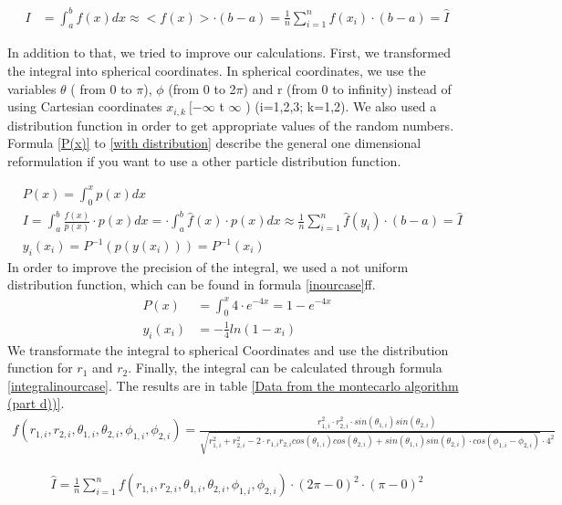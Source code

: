 \documentclass[10pt,a4paper]{article}
\begin{document}
\begin{align}
I &= \int_{a}^{b} f(x) dx \approx < f(x) > \cdot (b-a) = \frac{1}{n} \sum_{i=1}^{n} f(x_i) \cdot (b-a) = \hat{I} \label{integralbrute}
\end{align}
 
In addition to that, we tried to improve our calculations. First, we transformed the integral into spherical coordinates. In spherical coordinates, we use the variables $\theta$ ( from 0 to $\pi$), $\phi$ (from 0 to 2$\pi$) and r (from 0 to infinity) instead of using Cartesian coordinates $x_{i,k} \ [-\infty$ t $\infty$ ) (i=1,2,3; k=1,2). We also used a distribution function in order to get appropriate values of the random numbers.  Formula \ref{P(x)} to \ref{with distribution} describe the general one dimensional reformulation if you want to use a other particle distribution function. 


\begin{align}
&P(x) = \int_{0}^{x} p(x) dx \label{P(x)}\\
& I =  \int_{a}^{b} \frac{f(x)}{p(x)} \cdot p(x) dx = \cdot \int_{a}^{b} \hat{f}(x) \cdot p(x) dx \approx  \frac{1}{n} \sum_{i=1}^{n} \hat{f}(y_i) \cdot (b-a) = \hat{I} \\
&y_i(x_i) =P^{-1}\left(p(y(x_i))\right)= P^{-1}(x_i)\label{with distribution}
\end{align}
In order to improve the precision of the integral, we used a not uniform distribution function, which can be found in formula \ref{inourcase}ff. 
\begin{align}
P(x)&= \int_{0}^{x} 4 \cdot e^{-4 x} = 1- e^{-4x} \label{inourcase}\\
y_i(x_i)&= -\frac{1}{4} ln(1-x_i)
\end{align}
We transformate the integral to spherical Coordinates and use the distribution function for $r_1$ and $r_2$. Finally, the integral can be calculated through formula \ref{integralinourcase}. The results are in table \ref{Data from the  montecarlo algorithm (part d))}.
\begin{align}
f( r_{1,i}, r_{2,i}, \theta_{1,i}, \theta_{2,i}, \phi_{1,i}, \phi_{2,i}) = \frac{r_{1,i}^2 \cdot r_{2,i}^2 \cdot sin(\theta_{1,i}) sin(\theta_{2,i}) }{\sqrt{r_{1,i}^2+r_{2,i}^2-2 \cdot r_{1,i} r_{2,i}  cos(\theta_{1,i}) cos(\theta_{2,i}) + sin(\theta_{1,i}) sin(\theta_{2,i}) \cdot cos(\phi_{1,i}-\phi_{2,i})}\cdot 4^2}
\end{align}

\begin{align}
\hat{I}= \frac{1}{n} \sum_{i=1}^{n} f( r_{1,i}, r_{2,i}, \theta_{1,i}, \theta_{2,i}, \phi_{1,i}, \phi_{2,i}) \cdot (2 \pi - 0)^2 \cdot (\pi -0)^2  \label{integralinourcase}
\end{align}
\end{document}

